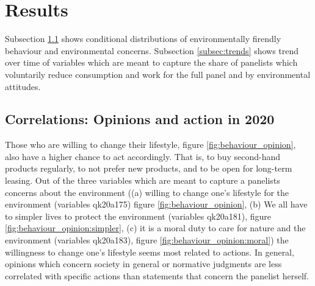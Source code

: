 \documentclass[12pt]{article}
\begin{document}
\section{Results}

Subsection \ref{subsec:heatmaps} shows conditional distributions  of environmentally firendly behaviour and environmental concerns. Subsection \ref{subsec:trends} shows trend over time of variables which are meant to capture the share of panelists which voluntarily reduce consumption and work for the full panel and by environmental attitudes. 

\subsection{Correlations: Opinions and action in 2020}\label{subsec:heatmaps}
Those who are willing to change their lifestyle, figure \ref{fig:behaviour_opinion}, also have a higher chance to act accordingly. That is, to buy second-hand products regularly, to not prefer new products, and to be open for long-term leasing. 
Out of the three variables which are meant to capture a panelists concerns about the environment ((a) willing to change one's lifestyle for the environment (variables qk20a175) figure \ref{fig:behaviour_opinion}, (b) We all have to simpler lives to protect the environment (variables qk20a181), figure \ref{fig:behaviour_opinion:simpler}, (c) it is a moral duty to care for nature and the environment (variables qk20a183), figure \ref{fig:behaviour_opinion:moral})
 the willingness to change one's lifestyle seems most related to actions. In general, opinions which concern society in general or normative judgments are less correlated with specific actions than statements that concern the panelist herself. 
\end{document}
